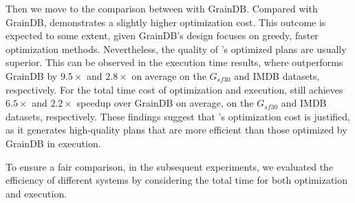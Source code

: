 {Then we move to the comparison between \name with GrainDB. Compared with GrainDB, \name demonstrates a slightly higher optimization cost. This outcome is expected to some extent, given GrainDB's design focuses on greedy, faster optimization methods.
Nevertheless, the quality of \name's optimized plans are usually superior. This can be observed in the execution time results, where \name outperforms GrainDB by $9.5\times$ and $2.8\times$ on average on the $G_{sf30}$ and IMDB datasets, respectively.
For the total time cost of optimization and execution, \name still achieves $6.5\times$ and $2.2\times$ speedup over GrainDB on average, on the $G_{sf30}$ and IMDB datasets, respectively.
These findings suggest that \name's optimization cost is justified, as it generates high-quality plans that are more efficient than those optimized by GrainDB in execution.

To ensure a fair comparison, in the subsequent experiments, we evaluated the efficiency of different systems by considering the total time for both optimization and execution.
}

